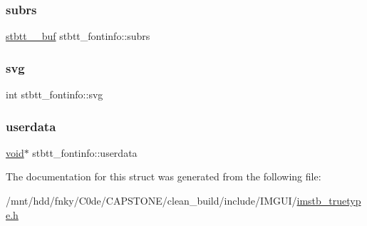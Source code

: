 \subsubsection{\texorpdfstring{subrs}{subrs}}
{\footnotesize\ttfamily \hyperlink{structstbtt____buf}{stbtt\+\_\+\+\_\+buf} stbtt\+\_\+fontinfo\+::subrs}

\mbox{\label{structstbtt__fontinfo_a2aae62e8e1269ab65be642a7ec82d7b3}} 
\subsubsection{\texorpdfstring{svg}{svg}}
{\footnotesize\ttfamily int stbtt\+\_\+fontinfo\+::svg}

\mbox{\label{structstbtt__fontinfo_a9c81078df96a7a3f730137151efab285}} 
\subsubsection{\texorpdfstring{userdata}{userdata}}
{\footnotesize\ttfamily \hyperlink{imgui__impl__opengl3__loader_8h_ac668e7cffd9e2e9cfee428b9b2f34fa7}{void}$\ast$ stbtt\+\_\+fontinfo\+::userdata}



The documentation for this struct was generated from the following file\+:\begin{DoxyCompactItemize}
\item 
/mnt/hdd/fnky/\+C0de/\+C\+A\+P\+S\+T\+O\+N\+E/clean\+\_\+build/include/\+I\+M\+G\+U\+I/\hyperlink{imstb__truetype_8h}{imstb\+\_\+truetype.\+h}\end{DoxyCompactItemize}

